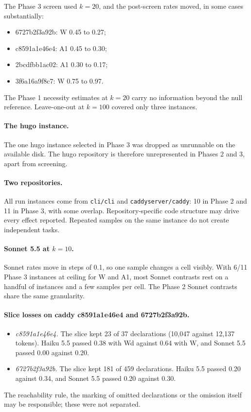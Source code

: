 The Phase 3 screen used $k=20$, and the post-screen rates moved, in some cases substantially:
\begin{itemize}
\item 6727b2f3a92b: W 0.45 to 0.27;
\item c8591a1e46e4: A1 0.45 to 0.30;
\item 2bcdfbb1ac02: A1 0.30 to 0.17;
\item 3f6a16a9f8c7: W 0.75 to 0.97.
\end{itemize}

The Phase 1 necessity estimates at $k=20$ carry no information beyond the null reference. Leave-one-out at $k=100$ covered only three instances.

\paragraph{The hugo instance.} The one hugo instance selected in Phase 3 was dropped as unrunnable on the available disk. The hugo repository is therefore unrepresented in Phases 2 and 3, apart from screening.

\paragraph{Two repositories.} All run instances come from \texttt{cli/cli} and \texttt{caddyserver/caddy}: 10 in Phase 2 and 11 in Phase 3, with some overlap. Repository-specific code structure may drive every effect reported. Repeated samples on the same instance do not create independent tasks.

\paragraph{Sonnet 5.5 at $k=10$.} Sonnet rates move in steps of 0.1, so one sample changes a cell visibly. With 6/11 Phase 3 instances at ceiling for W and A1, most Sonnet contrasts rest on a handful of instances and a few samples per cell. The Phase 2 Sonnet contrasts share the same granularity.

\paragraph{Slice losses on caddy c8591a1e46e4 and 6727b2f3a92b.}
\begin{itemize}
\item \emph{c8591a1e46e4.} The slice kept 23 of 37 declarations (10,047 against 12,137 tokens). Haiku 5.5 passed 0.38 with Wd against 0.64 with W, and Sonnet 5.5 passed 0.00 against 0.20.
\item \emph{6727b2f3a92b.} The slice kept 181 of 459 declarations. Haiku 5.5 passed 0.20 against 0.34, and Sonnet 5.5 passed 0.20 against 0.30.
\end{itemize}
The reachability rule, the marking of omitted declarations or the omission itself may be responsible; these were not separated.

